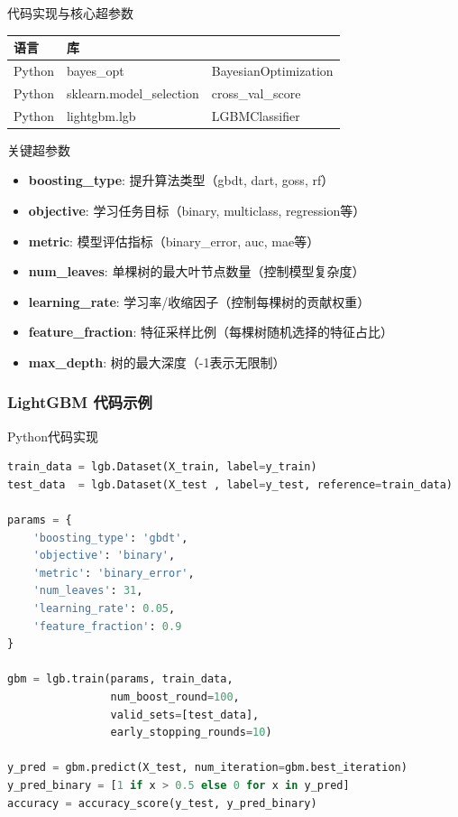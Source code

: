 \documentclass{ctexbeamer}
\begin{document}
\begin{frame}{代码实现与核心超参数}
\begin{table}
\centering
\begin{tabular}{lll}
\toprule
\textbf{语言} & \textbf{库} \\
\midrule
Python & bayes\_opt & BayesianOptimization\\
Python & sklearn.model\_selection & cross\_val\_score\\
Python & lightgbm.lgb & LGBMClassifier\\
\bottomrule
\end{tabular}
\end{table}

\begin{block}{关键超参数}
\begin{itemize}
\item \textbf{boosting\_type}: 提升算法类型（gbdt, dart, goss, rf）
\item \textbf{objective}: 学习任务目标（binary, multiclass, regression等）
\item \textbf{metric}: 模型评估指标（binary\_error, auc, mae等）
\item \textbf{num\_leaves}: 单棵树的最大叶节点数量（控制模型复杂度）
\item \textbf{learning\_rate}: 学习率/收缩因子（控制每棵树的贡献权重）
\item \textbf{feature\_fraction}: 特征采样比例（每棵树随机选择的特征占比）
\item \textbf{max\_depth}: 树的最大深度（-1表示无限制）
\end{itemize}
\end{block}
\end{frame}

\begin{frame}[fragile]     %
  \frametitle{LightGBM 代码示例}

  \begin{exampleblock}{Python代码实现}
\scriptsize
\begin{lstlisting}[language=Python]  
train_data = lgb.Dataset(X_train, label=y_train)
test_data  = lgb.Dataset(X_test , label=y_test, reference=train_data)

params = {
    'boosting_type': 'gbdt',
    'objective': 'binary',
    'metric': 'binary_error',
    'num_leaves': 31,
    'learning_rate': 0.05,
    'feature_fraction': 0.9
}

gbm = lgb.train(params, train_data,
                num_boost_round=100,
                valid_sets=[test_data],
                early_stopping_rounds=10)

y_pred = gbm.predict(X_test, num_iteration=gbm.best_iteration)
y_pred_binary = [1 if x > 0.5 else 0 for x in y_pred]
accuracy = accuracy_score(y_test, y_pred_binary)
\end{lstlisting}
  \end{exampleblock}
\end{frame}
\end{document}
